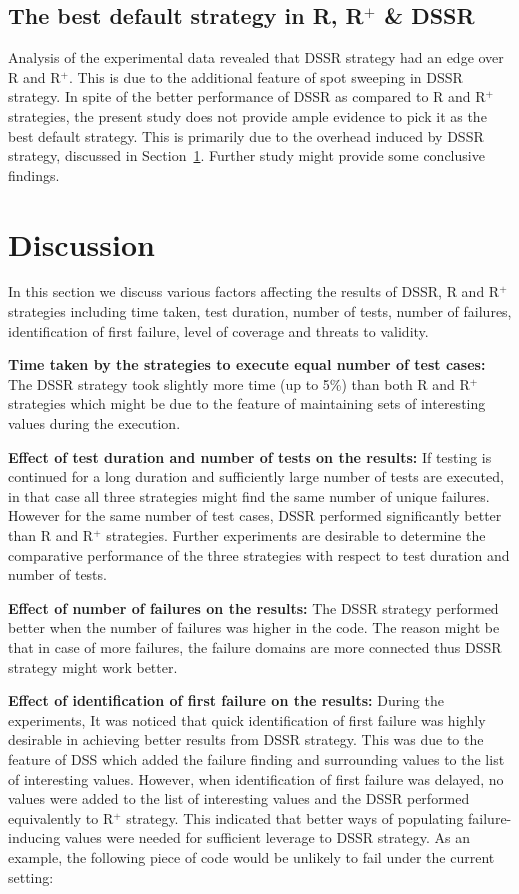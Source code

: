\subsection{The best default strategy in R, R$^+$ \& DSSR}

Analysis of the experimental data revealed that DSSR strategy had an edge over R and R$^+$. This is due to the additional feature of spot sweeping in DSSR strategy. In spite of the better performance of DSSR as compared to R and R$^+$ strategies, the present study does not provide ample evidence to pick it as the best default strategy. This is primarily due to the overhead induced by DSSR strategy, discussed in Section~\ref{sec:discussion3}. Further study might provide some conclusive findings. 





\section{Discussion}\label{sec:discussion3}
In this section we discuss various factors affecting the results of DSSR, R and R$^+$ strategies including time taken, test duration, number of tests, number of failures, identification of first failure, level of coverage and threats to validity.

\textbf{Time taken by the strategies to execute equal number of test cases:}
The DSSR strategy took slightly more time (up to 5\%) than both R and R$^+$ strategies which might be due to the feature of maintaining sets of interesting values during the execution. 

\textbf{Effect of test duration and number of tests on the results:}
If testing is continued for a long duration and sufficiently large number of tests are executed, in that case all three strategies might find the same number of unique failures. However for the same number of test cases, DSSR performed significantly better than R and R$^+$ strategies. Further experiments are desirable to determine the comparative performance of the three strategies with respect to test duration and number of tests.

\textbf{Effect of number of failures on the results:} 
The DSSR strategy performed better when the number of failures was higher in the code. The reason might be that in case of more failures, the failure domains are more connected thus DSSR strategy might work better.

\textbf{Effect of identification of first failure on the results:}
During the experiments, It was noticed that quick identification of first failure was highly desirable in achieving better results from DSSR strategy. This was due to the feature of DSS which added the failure finding and surrounding values to the list of interesting values. However, when identification of first failure was delayed, no values were added to the list of interesting values and the DSSR performed equivalently to R$^+$ strategy. This indicated that better ways of populating failure-inducing values were needed for sufficient leverage to DSSR strategy. As an example, the following piece of code would be unlikely to fail under the current setting:

